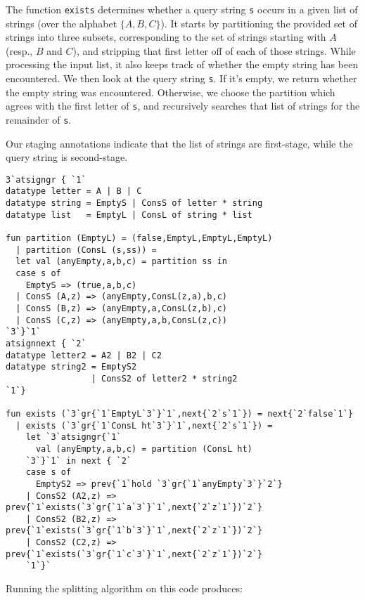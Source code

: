 The function {\tt exists} determines whether a query string \texttt{s} occurs in
a given list of strings (over the alphabet $\{A,B,C\}$). It starts by
partitioning the provided set of strings into three subsets, corresponding to
the set of strings starting with $A$ (resp., $B$ and $C$), and stripping that
first letter off of each of those strings. While processing the input list, it
also keeps track of whether the empty string has been encountered.
%
We then look at the query string \texttt{s}. If it's empty, we return whether
the empty string was encountered. Otherwise, we choose the partition which
agrees with the first letter of \texttt{s}, and recursively searches that list
of strings for the remainder of \texttt{s}.

Our staging annotations indicate that the list of strings are first-stage, while
the query string is second-stage.
\begin{lstlisting} 
3`atsigngr { `1`
datatype letter = A | B | C 
datatype string = EmptyS | ConsS of letter * string
datatype list   = EmptyL | ConsL of string * list

fun partition (EmptyL) = (false,EmptyL,EmptyL,EmptyL) 
  | partition (ConsL (s,ss)) = 
  let val (anyEmpty,a,b,c) = partition ss in 
  case s of 
    EmptyS => (true,a,b,c) 
  | ConsS (A,z) => (anyEmpty,ConsL(z,a),b,c) 
  | ConsS (B,z) => (anyEmpty,a,ConsL(z,b),c) 
  | ConsS (C,z) => (anyEmpty,a,b,ConsL(z,c)) 
`3`}`1`
atsignnext { `2`
datatype letter2 = A2 | B2 | C2
datatype string2 = EmptyS2 
				 | ConsS2 of letter2 * string2
`1`}

fun exists (`3`gr{`1`EmptyL`3`}`1`,next{`2`s`1`}) = next{`2`false`1`} 
  | exists (`3`gr{`1`ConsL ht`3`}`1`,next{`2`s`1`}) = 
	let `3`atsigngr{`1`
	  val (anyEmpty,a,b,c) = partition (ConsL ht)
	`3`}`1` in next { `2`
	case s of 
	  EmptyS2 => prev{`1`hold `3`gr{`1`anyEmpty`3`}`2`} 
	| ConsS2 (A2,z) => prev{`1`exists(`3`gr{`1`a`3`}`1`,next{`2`z`1`})`2`} 
	| ConsS2 (B2,z) => prev{`1`exists(`3`gr{`1`b`3`}`1`,next{`2`z`1`})`2`}
	| ConsS2 (C2,z) => prev{`1`exists(`3`gr{`1`c`3`}`1`,next{`2`z`1`})`2`}  
	`1`}` 
\end{lstlisting}
Running the splitting algorithm on this code produces:
